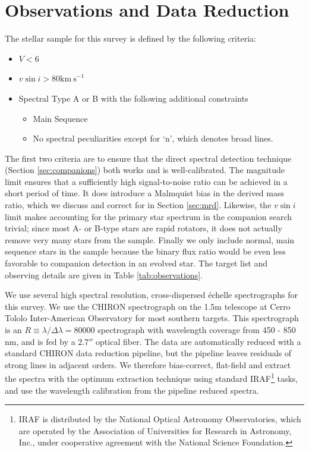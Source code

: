 \documentclass{emulateapj}
\begin{document}
 


\section{Observations and Data Reduction}
\label{sec:obs}

The stellar sample for this survey is defined by the following criteria:

\begin{itemize}
\item $V < 6$
\item $v\sin{i} > 80 \mathrm{km\ s}^{-1}$
\item Spectral Type A or B with the following additional constraints
\begin{itemize}
  \item Main Sequence
  \item No spectral peculiarities except for `n', which denotes broad lines.
\end{itemize}
\end{itemize}

The first two criteria are to ensure that the direct spectral detection technique (Section \ref{sec:companions}) both works and is well-calibrated. The magnitude limit ensures that a sufficiently high signal-to-noise ratio can be achieved in a short period of time. It does introduce a Malmquist bias in the derived mass ratio, which we discuss and correct for in Section \ref{sec:mrd}. Likewise, the $v\sin{i}$ limit makes accounting for the primary star spectrum in the companion search trivial; since most A- or B-type stars are rapid rotators, it does not actually remove very many stars from the sample. Finally we only include normal, main sequence stars in the sample because the binary flux ratio would be even less favorable to companion detection in an evolved star. The target list and observing details are given in Table \ref{tab:observations}.

We use several high spectral resolution, cross-dispersed \'echelle spectrographs for this survey. We use the CHIRON spectrograph \citep{CHIRON} on the 1.5m telescope at Cerro Tololo Inter-American Observatory for most southern targets. This spectrograph is an $R\equiv \lambda / \Delta \lambda = 80000$ spectrograph with wavelength coverage from 450 - 850 nm, and is fed by a $2.7''$ optical fiber. The data are automatically reduced with a standard CHIRON data reduction pipeline, but the pipeline leaves residuals of strong lines in adjacent orders. We therefore bias-correct, flat-field and extract the spectra with the optimum extraction technique \citep{Horne1986} using standard IRAF\footnote{IRAF is distributed by the National Optical Astronomy Observatories, which are operated by the Association of Universities for Research in Astronomy, Inc., under cooperative agreement with the National Science Foundation.} tasks, and use the wavelength calibration from the pipeline reduced spectra.
\end{document}
